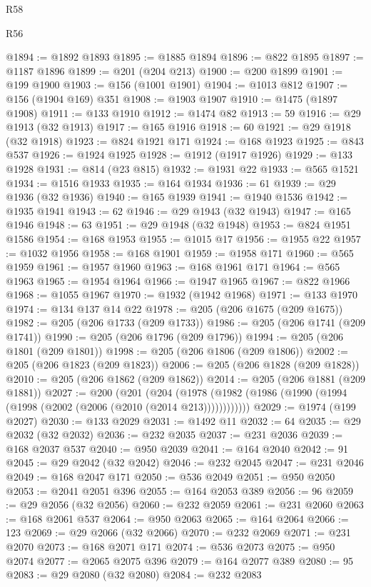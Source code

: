 \begin{lexlean}{R58}
\begin{lexlean}{R56}
\begin{coremodule}
{{{{{{{{{{{{{{{{{{{{{{{{{{{{{{{{{{{{{{{{{{{{{{{{{{{{{{{{{{{{{{{{{{{{{{{{{{{{{{{{{{{{{{{{{{{{{{{{{{{{{{{{{{{{{{{{{{{{{{{{{{{{{{{{{{{{{{{{{{{{{{{{{{{{{{{{{{{{{{{{{{{{{{{{{{{{{{{{{{{{{{{{{{{{{{{{{{{{{{{{{{{{{{{{{{{@1894 := @1892 @1893
@1895 := @1885 @1894
@1896 := @822 @1895
@1897 := @1187 @1896
@1899 := @201 (@204 @213)
@1900 := @200 @1899
@1901 := @199 @1900
@1903 := @156 (@1001 @1901)
@1904 := @1013 @812
@1907 := @156 (@1904 @169) @351
@1908 := @1903 @1907
@1910 := @1475 (@1897 @1908)
@1911 := @133 @1910
@1912 := @1474 @82
@1913 := 59
@1916 := @29 @1913 (@32 @1913)
@1917 := @165 @1916
@1918 := 60
@1921 := @29 @1918 (@32 @1918)
@1923 := @824 @1921 @171
@1924 := @168 @1923
@1925 := @843 @537
@1926 := @1924 @1925
@1928 := @1912 (@1917 @1926)
@1929 := @133 @1928
@1931 := @814 (@23 @815)
@1932 := @1931 @22
@1933 := @565 @1521
@1934 := @1516 @1933
@1935 := @164 @1934
@1936 := 61
@1939 := @29 @1936 (@32 @1936)
@1940 := @165 @1939
@1941 := @1940 @1536
@1942 := @1935 @1941
@1943 := 62
@1946 := @29 @1943 (@32 @1943)
@1947 := @165 @1946
@1948 := 63
@1951 := @29 @1948 (@32 @1948)
@1953 := @824 @1951 @1586
@1954 := @168 @1953
@1955 := @1015 @17
@1956 := @1955 @22
@1957 := @1032 @1956
@1958 := @168 @1901
@1959 := @1958 @171
@1960 := @565 @1959
@1961 := @1957 @1960
@1963 := @168 @1961 @171
@1964 := @565 @1963
@1965 := @1954 @1964
@1966 := @1947 @1965
@1967 := @822 @1966
@1968 := @1055 @1967
@1970 := @1932 (@1942 @1968)
@1971 := @133 @1970
@1974 := @134 @137 @14 @22
@1978 := @205 (@206 @1675 (@209 @1675))
@1982 := @205 (@206 @1733 (@209 @1733))
@1986 := @205 (@206 @1741 (@209 @1741))
@1990 := @205 (@206 @1796 (@209 @1796))
@1994 := @205 (@206 @1801 (@209 @1801))
@1998 := @205 (@206 @1806 (@209 @1806))
@2002 := @205 (@206 @1823 (@209 @1823))
@2006 := @205 (@206 @1828 (@209 @1828))
@2010 := @205 (@206 @1862 (@209 @1862))
@2014 := @205 (@206 @1881 (@209 @1881))
@2027 := @200
    (@201
      (@204 (@1978 (@1982 (@1986 (@1990 (@1994 (@1998 (@2002 (@2006 (@2010 (@2014 @213))))))))))))
@2029 := @1974 (@199 @2027)
@2030 := @133 @2029
@2031 := @1492 @11
@2032 := 64
@2035 := @29 @2032 (@32 @2032)
@2036 := @232 @2035
@2037 := @231 @2036
@2039 := @168 @2037 @537
@2040 := @950 @2039
@2041 := @164 @2040
@2042 := 91
@2045 := @29 @2042 (@32 @2042)
@2046 := @232 @2045
@2047 := @231 @2046
@2049 := @168 @2047 @171
@2050 := @536 @2049
@2051 := @950 @2050
@2053 := @2041 @2051 @396
@2055 := @164 @2053 @389
@2056 := 96
@2059 := @29 @2056 (@32 @2056)
@2060 := @232 @2059
@2061 := @231 @2060
@2063 := @168 @2061 @537
@2064 := @950 @2063
@2065 := @164 @2064
@2066 := 123
@2069 := @29 @2066 (@32 @2066)
@2070 := @232 @2069
@2071 := @231 @2070
@2073 := @168 @2071 @171
@2074 := @536 @2073
@2075 := @950 @2074
@2077 := @2065 @2075 @396
@2079 := @164 @2077 @389
@2080 := 95
@2083 := @29 @2080 (@32 @2080)
@2084 := @232 @2083
}}}}}}}}}}}}}}}}}}}}}}}}}}}}}}}}}}}}}}}}}}}}}}}}}}}}}}}}}}}}}}}}}}}}}}}}}}}}}}}}}}}}}}}}}}}}}}}}}}}}}}}}}}}}}}}}}}}}}}}}}}}}}}}}}}}}}}}}}}}}}}}}}}}}}}}}}}}}}}}}}}}}}}}}}}}}}}}}}}}}}}}}}}}}}}}}}}}}}}}}}}}}}}}}}}}
\end{coremodule}
\end{lexlean}
\end{lexlean}

